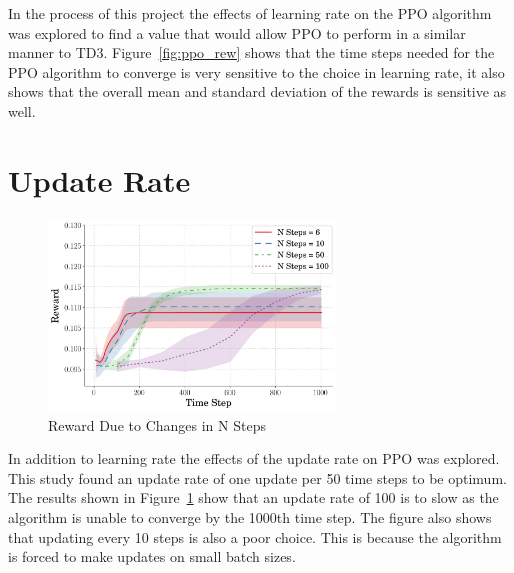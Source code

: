 \documentclass[10pt,twocolumn,letterpaper]{article}
\begin{document}
        
In the process of this project the effects of learning rate on the PPO algorithm was explored to find a value that would allow PPO to perform in a similar manner to TD3. Figure~\ref{fig:ppo_rew} shows that the time steps needed for the PPO algorithm to converge is very sensitive to the choice in learning rate, it also shows that the overall mean and standard deviation of the rewards is sensitive as well.

\section{Update Rate}
\label{app:ur_changes}

\begin{figure}[b]
\begin{center}
        \includegraphics[width = 3in]{figures/ppo_n_steps/avg_rew_ppo.png}
        \caption{Reward Due to Changes in N Steps}
        \label{fig:n_steps}
\end{center}
\end{figure}

In addition to learning rate the effects of the update rate on PPO was explored. This study found an update rate of one update per 50 time steps to be optimum. The results shown in Figure~\ref{fig:n_steps} show that an update rate of 100 is to slow as the algorithm is unable to converge by the 1000th time step. The figure also shows that updating every 10 steps is also a poor choice. This is because the algorithm is forced to make updates on small batch sizes.
\end{document}
